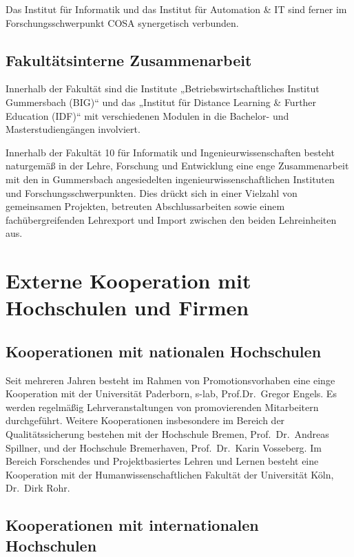 Das Institut für Informatik und das Institut für Automation \& IT sind
ferner im Forschungsschwerpunkt COSA synergetisch verbunden.

\subsection{Fakultätsinterne
Zusammenarbeit}\label{fakultuxe4tsinterne-zusammenarbeit}

Innerhalb der Fakultät sind die Institute „Betriebswirtschaftliches
Institut Gummersbach (BIG)`` und das „Institut für Distance Learning \&
Further Education (IDF)`` mit verschiedenen Modulen in die Bachelor- und
Masterstudiengängen involviert.

Innerhalb der Fakultät 10 für Informatik und Ingenieurwissenschaften
besteht naturgemäß in der Lehre, Forschung und Entwicklung eine enge
Zusammenarbeit mit den in Gummersbach angesiedelten
ingenieurwissenschaftlichen Instituten und Forschungsschwerpunkten. Dies
drückt sich in einer Vielzahl von gemeinsamen Projekten, betreuten
Abschlussarbeiten sowie einem fachübergreifenden Lehrexport und Import
zwischen den beiden Lehreinheiten aus.

\section{Externe Kooperation mit Hochschulen und
Firmen}\label{externe-kooperation-mit-hochschulen-und-firmen}

\subsection{Kooperationen mit nationalen
Hochschulen}\label{kooperationen-mit-nationalen-hochschulen}

Seit mehreren Jahren besteht im Rahmen von Promotionsvorhaben eine einge
Kooperation mit der Universität Paderborn, s-lab, Prof.Dr.~Gregor
Engels. Es werden regelmäßig Lehrveranstaltungen von promovierenden
Mitarbeitern durchgeführt. Weitere Kooperationen insbesondere im Bereich
der Qualitätssicherung bestehen mit der Hochschule Bremen,
Prof.~Dr.~Andreas Spillner, und der Hochschule Bremerhaven,
Prof.~Dr.~Karin Vosseberg. Im Bereich Forschendes und Projektbasiertes
Lehren und Lernen besteht eine Kooperation mit der
Humanwissenschaftlichen Fakultät der Universität Köln, Dr.~Dirk Rohr.

\subsection{Kooperationen mit internationalen
Hochschulen}\label{kooperationen-mit-internationalen-hochschulen}

